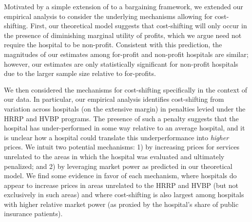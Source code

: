\documentclass[12pt]{article}
\begin{document}
Motivated by a simple extension of \cite{dranove1988} to a bargaining framework, we extended our empirical analysis to consider the underlying mechanisms allowing for cost-shifting. First, our theoretical model suggests that cost-shifting will only occur in the presence of diminishing marginal utility of profits, which we argue need not require the hospital to be non-profit. Consistent with this prediction, the magnitudes of our estimates among for-profit and non-profit hospitals are similar; however, our estimates are only statistically significant for non-profit hospitals due to the larger sample size relative to for-profits.

We then considered the mechanisms for cost-shifting specifically in the context of our data. In particular, our empirical analysis identifies cost-shifting from variation across hospitals (on the extensive margin) in penalties levied under the HRRP and HVBP programs. The presence of such a penalty suggests that the hospital has under-performed in some way relative to an average hospital, and it is unclear how a hospital could translate this underperformance into \textit{higher} prices. We intuit two potential mechanisms: 1) by increasing prices for services unrelated to the areas in which the hospital was evaluated and ultimately penalized; and 2) by leveraging market power as predicted in our theoretical model. We find some evidence in favor of each mechanism, where hospitals do appear to increase prices in areas unrelated to the HRRP and HVBP (but not exclusively in such areas) and where cost-shifting is also largest among hospitals with higher relative market power (as proxied by the hospital's share of public insurance patients).
\end{document}
